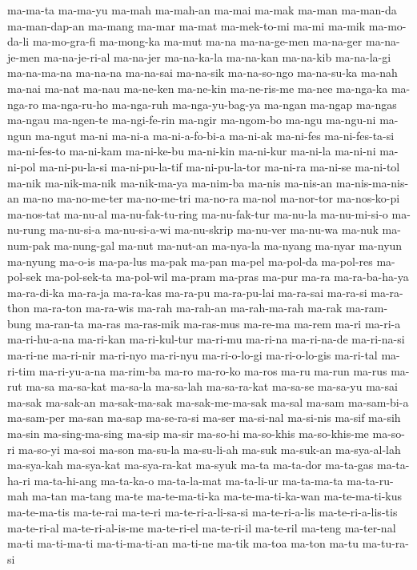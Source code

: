 {ma-ma-ta ma-ma-yu ma-mah ma-mah-an ma-mai ma-mak ma-man ma-man-da
ma-man-dap-an ma-mang ma-mar ma-mat ma-mek-to-mi ma-mi ma-mik ma-mo-da-li
ma-mo-gra-fi ma-mong-ka ma-mut ma-na ma-na-ge-men ma-na-ger ma-na-je-men
ma-na-je-ri-al ma-na-jer ma-na-ka-la ma-na-kan ma-na-kib ma-na-la-gi
ma-na-ma-na ma-na-na ma-na-sai ma-na-sik ma-na-so-ngo ma-na-su-ka ma-nah
ma-nai ma-nat ma-nau ma-ne-ken ma-ne-kin ma-ne-ris-me ma-nee ma-nga-ka
ma-nga-ro ma-nga-ru-ho ma-nga-ruh ma-nga-yu-bag-ya ma-ngan ma-ngap ma-ngas
ma-ngau ma-ngen-te ma-ngi-fe-rin ma-ngir ma-ngom-bo ma-ngu ma-ngu-ni
ma-ngun ma-ngut ma-ni ma-ni-a ma-ni-a-fo-bi-a ma-ni-ak ma-ni-fes
ma-ni-fes-ta-si ma-ni-fes-to ma-ni-kam ma-ni-ke-bu ma-ni-kin ma-ni-kur
ma-ni-la ma-ni-ni ma-ni-pol ma-ni-pu-la-si ma-ni-pu-la-tif ma-ni-pu-la-tor
ma-ni-ra ma-ni-se ma-ni-tol ma-nik ma-nik-ma-nik ma-nik-ma-ya ma-nim-ba
ma-nis ma-nis-an ma-nis-ma-nis-an ma-no ma-no-me-ter ma-no-me-tri ma-no-ra
ma-nol ma-nor-tor ma-nos-ko-pi ma-nos-tat ma-nu-al ma-nu-fak-tu-ring
ma-nu-fak-tur ma-nu-la ma-nu-mi-si-o ma-nu-rung ma-nu-si-a ma-nu-si-a-wi
ma-nu-skrip ma-nu-ver ma-nu-wa ma-nuk ma-num-pak ma-nung-gal ma-nut
ma-nut-an ma-nya-la ma-nyang ma-nyar ma-nyun ma-nyung ma-o-is ma-pa-lus
ma-pak ma-pan ma-pel ma-pol-da ma-pol-res ma-pol-sek ma-pol-sek-ta
ma-pol-wil ma-pram ma-pras ma-pur ma-ra ma-ra-ba-ha-ya ma-ra-di-ka
ma-ra-ja ma-ra-kas ma-ra-pu ma-ra-pu-lai ma-ra-sai ma-ra-si ma-ra-thon
ma-ra-ton ma-ra-wis ma-rah ma-rah-an ma-rah-ma-rah ma-rak ma-ram-bung
ma-ran-ta ma-ras ma-ras-mik ma-ras-mus ma-re-ma ma-rem ma-ri ma-ri-a
ma-ri-hu-a-na ma-ri-kan ma-ri-kul-tur ma-ri-mu ma-ri-na ma-ri-na-de
ma-ri-na-si ma-ri-ne ma-ri-nir ma-ri-nyo ma-ri-nyu ma-ri-o-lo-gi
ma-ri-o-lo-gis ma-ri-tal ma-ri-tim ma-ri-yu-a-na ma-rim-ba ma-ro ma-ro-ko
ma-ros ma-ru ma-run ma-rus ma-rut ma-sa ma-sa-kat ma-sa-la ma-sa-lah
ma-sa-ra-kat ma-sa-se ma-sa-yu ma-sai ma-sak ma-sak-an ma-sak-ma-sak
ma-sak-me-ma-sak ma-sal ma-sam ma-sam-bi-a ma-sam-per ma-san ma-sap
ma-se-ra-si ma-ser ma-si-nal ma-si-nis ma-sif ma-sih ma-sin
ma-sing-ma-sing ma-sip ma-sir ma-so-hi ma-so-khis ma-so-khis-me ma-so-ri
ma-so-yi ma-soi ma-son ma-su-la ma-su-li-ah ma-suk ma-suk-an ma-sya-al-lah
ma-sya-kah ma-sya-kat ma-sya-ra-kat ma-syuk ma-ta ma-ta-dor ma-ta-gas
ma-ta-ha-ri ma-ta-hi-ang ma-ta-ka-o ma-ta-la-mat ma-ta-li-ur ma-ta-ma-ta
ma-ta-ru-mah ma-tan ma-tang ma-te ma-te-ma-ti-ka ma-te-ma-ti-ka-wan
ma-te-ma-ti-kus ma-te-ma-tis ma-te-rai ma-te-ri ma-te-ri-a-li-sa-si
ma-te-ri-a-lis ma-te-ri-a-lis-tis ma-te-ri-al ma-te-ri-al-is-me
ma-te-ri-el ma-te-ri-il ma-te-ril ma-teng ma-ter-nal ma-ti ma-ti-ma-ti
ma-ti-ma-ti-an ma-ti-ne ma-tik ma-toa ma-ton ma-tu ma-tu-ra-si
}
